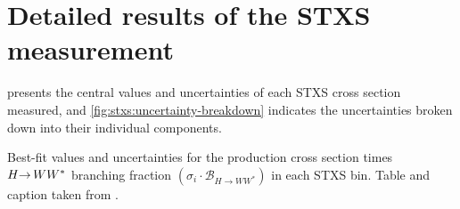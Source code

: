     \begin{table}[!h]
        \centering
        \renewcommand{\arraystretch}{1.6}
        \caption{
            Post-fit normalization factors which scale the corresponding estimated yields in the relevant signal region; the dash indicates where a MC-based normalization is used.
            The quoted uncertainties include both the statistical and systematic contributions.
            Table and caption taken from .
        }
        \label{tab:CRs_NF}
    \end{table}


    \FloatBarrier
    \section{Detailed results of the STXS measurement}
    \label{app:stxs-measurement}

     presents the central values and uncertainties of each STXS cross section measured, and \cref{fig:stxs:uncertainty-breakdown} indicates the uncertainties broken down into their individual components.
    
    \begin{table}[htp]
        \caption{
        Best-fit values and uncertainties for the production cross section times $H{\rightarrow\,}WW^{\ast}$ branching fraction $({\sigma_i \cdot \mathcal{B}_{H \to WW^{\ast}}})$ in each STXS bin.
        Table and caption taken from .
        }
        \begin{center}
            \small
            \renewcommand{\arraystretch}{1.5}
            \resizebox{\textwidth}{!}{
                
            }
        \end{center}
        \label{tab:STXS-XSecs}
    \end{table}

